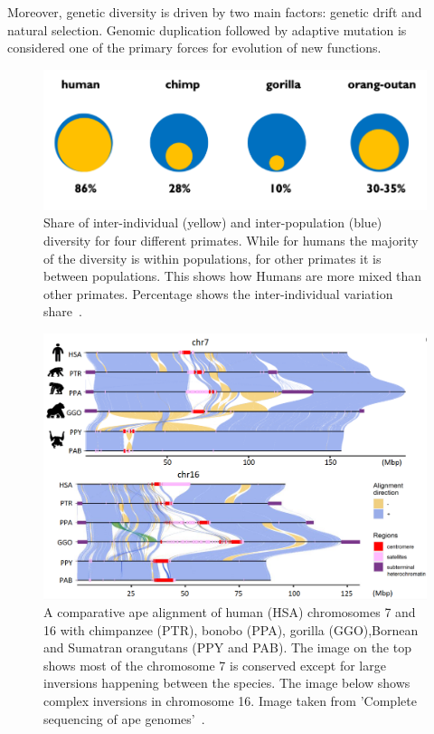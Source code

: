 Moreover, genetic diversity is driven by two main factors: genetic drift and natural selection. Genomic duplication followed by adaptive mutation is considered one of the primary forces for evolution of new functions.
\begin{figure}[h!]
	\centering
	\includegraphics[width=.8\linewidth]{figures/background/pop_diff.png}
	\caption[Inter-individual and inter-population variation for 4 primate species.]{Share of inter-individual (yellow) and inter-population (blue) diversity for four different primates. While for humans the  majority of the diversity is within populations, for other primates it is between populations. This shows how Humans are more mixed than other primates. Percentage shows the inter-individual variation share~\cite{genome_diversity_quintana}.}
	\label{fig:pop_diff}
\end{figure}

\begin{figure}[h!]
	\centering
	\includegraphics[width=.95\linewidth]{figures/background/genome_diff.png}
	\caption[Genomic difference in chromosome 7 and 16 of 5 primate species.]{A comparative ape alignment of human (HSA) chromosomes 7 and 16 with chimpanzee (PTR), bonobo (PPA), gorilla (GGO),Bornean and Sumatran orangutans (PPY and PAB). The image on the top shows most of the chromosome 7 is conserved except for large inversions happening between the species. The image below shows complex inversions in chromosome 16. Image taken from 'Complete sequencing of ape genomes'~\cite{ape_genomes}.}
	\label{fig:chromosome_diff}
\end{figure}

